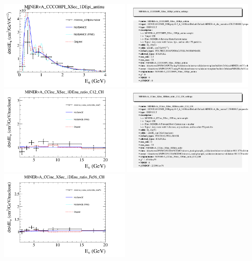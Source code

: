 \documentclass{article}
\begin{document}
\centering
\includegraphics[width=0.49\textwidth]{figures/minerva_cohtpinumubar_comp.png}
\includegraphics[width=0.49\textwidth]{figures/minerva_cohtpinumubar_info.png}
\centering
\includegraphics[width=0.49\textwidth]{figures/minerva_numu_ccincratio_enuC_comp.png}
\includegraphics[width=0.49\textwidth]{figures/minerva_numu_ccincratio_enuC_info.png}
\centering
\includegraphics[width=0.49\textwidth]{figures/minerva_numu_ccincratio_enuFe_comp.png}
\end{document}

